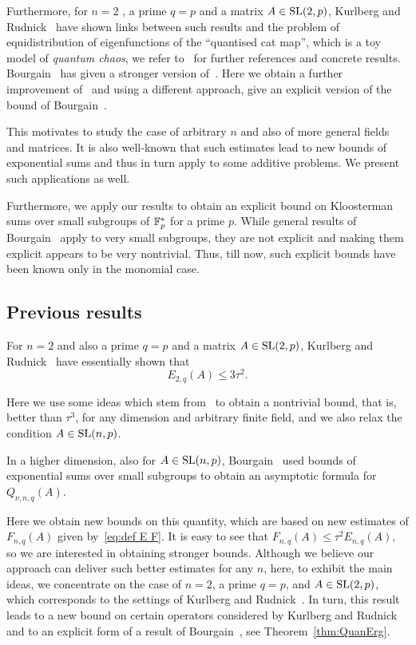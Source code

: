 \documentclass[12pt]{amsart}
\begin{document}
Furthermore, for $n =2$ , a prime $q=p$ and  a matrix $A \in \operatorname{SL}(2,p)$, 
 Kurlberg and Rudnick~\cite{KR} have shown links between such results and 
 the problem of equidistribution of eigenfunctions  of the ``quantised cat map'', which is a toy model of {\it quantum chaos\/}, we refer to~\cite{GuHa,Kel,KRR,Kurl,KR0,KR,KR2,Ros} for further references and concrete results. Bourgain~\cite{Bourg2}
has given a stronger version of~\cite{KR}. Here we obtain a further improvement 
of~\cite{Bourg2,KR} 
and using a different approach,  give an explicit version of the bound of Bourgain~\cite[Theorem~3]{Bourg2}. 

This motivates to study the case of arbitrary $n$ and also of more general fields 
and matrices. It is also well-known that such  estimates lead to new bounds of 
exponential sums and thus in turn apply to some additive problems. We present such 
applications as well. 

Furthermore, we apply our results to obtain an explicit bound on Kloosterman 
sums over small subgroups of ${\mathbb F}_p^*$ for a prime $p$. While general results of Bourgain~\cite{Bourg1} apply to very small subgroups, they are not explicit and 
making them explicit appears to be very nontrivial. Thus, till now, such explicit 
bounds have been known only in the monomial case. 

 
 \subsection{Previous results}
 For $n =2$ and also a prime $q=p$ and  a matrix $A \in \operatorname{SL}(2,p)$, 
 Kurlberg and Rudnick~\cite{KR} have essentially  shown that   
\begin{equation}
\label{eq:KR bound}
E_{2,q}(A) \le 3\tau^2.
\end{equation}


Here we use some ideas which stem from~\cite{CFKLLS} to obtain a nontrivial bound, 
that is, better than $\tau^3$, for any dimension and arbitrary finite field, and we also relax the condition $A \in \operatorname{SL}(n,p)$.



In a higher dimension, also for  $A \in \operatorname{SL}(n,p)$, Bourgain~\cite{Bourg2} used bounds of exponential sums 
 over small subgroups to obtain an asymptotic formula for $Q_{\nu,n,q}(A)$. 
 
Here we obtain new bounds on this quantity, which are based on new estimates 
of $F_{n,q}(A)$ given by~\eqref{eq:def E F}.  It is easy to see that  
$F_{n,q}(A) \le \tau^2 E_{n,q}(A)$, so we are interested in obtaining stronger bounds.
Although we believe our approach can deliver such better estimates for any $n$, 
here, to exhibit the main ideas, we concentrate on the case of $n=2$, a prime $q=p$, 
and $A \in \operatorname{SL}(2,p)$, which corresponds to the settings of Kurlberg and 
Rudnick~\cite{KR}.  In turn, this result leads to 
a new bound on  certain operators considered by Kurlberg and Rudnick~\cite{KR}
and to an explicit form of a result of Bourgain~\cite[Proposition~1]{Bourg2}, see Theorem~\ref{thm:QuanErg}.   
\end{document}
